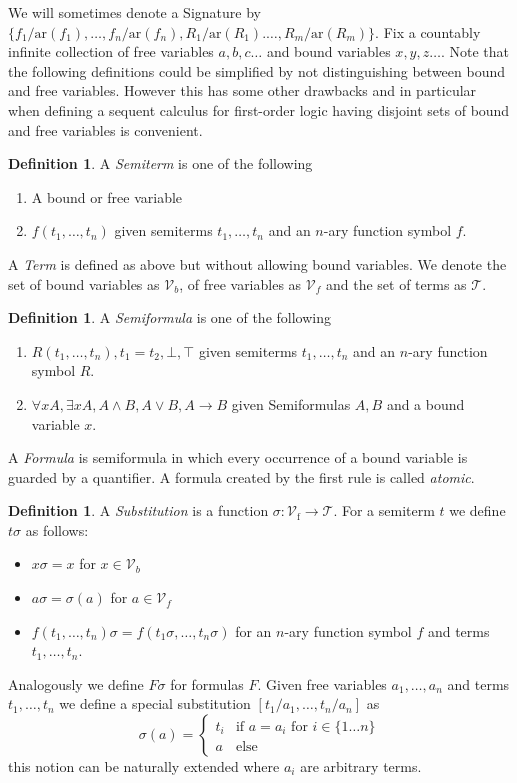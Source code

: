 \documentclass[onehalfspacing]{article}
\theoremstyle{definition}
\theoremstyle{definition}
\theoremstyle{definition}
\theoremstyle{definition}
\theoremstyle{definition}
\newtheorem{definition}[theorem]{Definition}
\theoremstyle{definition}
\begin{document}
\noindent We will sometimes denote a Signature by $\{f_1/\text{ar}(f_1),\dots,f_n/\text{ar}(f_n), R_1/\text{ar}(R_1).\dots,R_m/\text{ar}(R_m)\}$.
Fix a countably infinite collection of free variables $a, b, c\dots$ and bound variables $x, y, z\dots$. 
Note that the following definitions could be simplified by not distinguishing between bound and free variables. However this has some other drawbacks and in particular when defining a sequent calculus for first-order logic having disjoint sets of bound and free variables is convenient.

\begin{definition}
	A \textit{Semiterm} is one of the following
	\begin{enumerate}
		\item A bound or free variable
		\item $f(t_1, \dots, t_n)$ given semiterms $t_1,\dots,t_n$ and an $n$-ary function symbol $f$.
	\end{enumerate}
	A \textit{Term} is defined as above but without allowing bound variables. We denote the set of bound variables as $\mathcal{V}_b$, of free variables as $\mathcal{V}_f$ and the set of terms as $\mathcal{T}$.
\end{definition}

\begin{definition}
	A \textit{Semiformula} is one of the following
	\begin{enumerate}
		\item $R(t_1, \dots, t_n), t_1 = t_2, \bot, \top$ given semiterms $t_1,\dots,t_n$ and an $n$-ary function symbol $R$.
		\item $\forall x A, \exists x A, A\wedge B, A\vee B, A\to B$ given Semiformulas $A, B$ and a bound variable $x$.
	\end{enumerate}
	A \textit{Formula} is semiformula in which every occurrence of a bound variable is guarded by a quantifier. A formula created by the first rule is called \textit{atomic}.
\end{definition}

\begin{definition}
	A \textit{Substitution} is a function $\sigma: \mathcal{V}_\text{f}\to\mathcal{T}$. For a semiterm $t$ we define $t\sigma$ as follows:
	\begin{itemize}
		\item $x\sigma = x$ for $x\in \mathcal{V}_b$
		\item $a\sigma = \sigma(a)$ for $a\in \mathcal{V}_f$
		\item $f(t_1,\dots,t_n)\sigma = f(t_1\sigma,\dots,t_n\sigma)$ for an $n$-ary function symbol $f$ and terms $t_1,\dots,t_n$.
	\end{itemize}
	Analogously we define $F\sigma$ for formulas $F$. Given free variables $a_1,\dots,a_n$ and terms $t_1,\dots,t_n$ we define a special substitution $[t_1/a_1,\dots,t_n/a_n]$ as $$\sigma(a) = \begin{cases}
		t_i & \text{if } a = a_i \text{ for } i \in \{1\dots n\}\\
		a & \text{else}
	\end{cases}$$this notion can be naturally extended where $a_i$ are arbitrary terms.
\end{definition}
\end{document}
